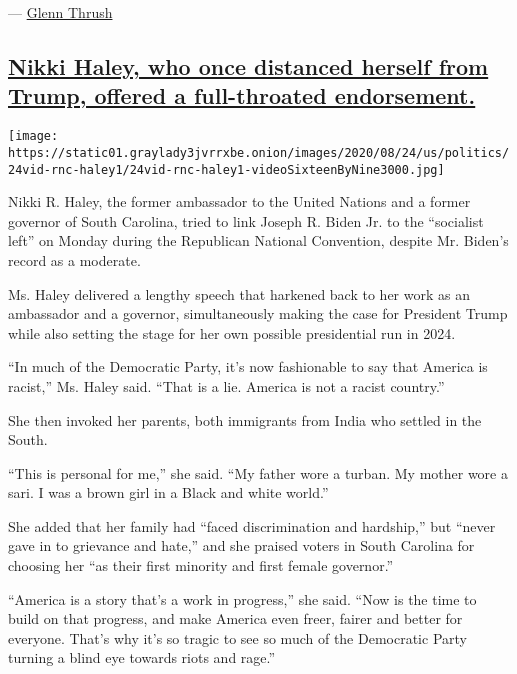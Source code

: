 --- \href{https://www.nytimes3xbfgragh.onion/by/glenn-thrush}{Glenn
Thrush}

\hypertarget{nikki-haley-who-once-distanced-herself-from-trump-offered-a-full-throated-endorsement}{%
\subsection{\texorpdfstring{\protect\hyperlink{Nikki-Haley-who-once-distanced-herself-from-Trump-offered-a-full-throated-endorsement}{Nikki
Haley, who once distanced herself from Trump, offered a full-throated
endorsement.}}{Nikki Haley, who once distanced herself from Trump, offered a full-throated endorsement.}}\label{nikki-haley-who-once-distanced-herself-from-trump-offered-a-full-throated-endorsement}}

\texttt{[image: https://static01.graylady3jvrrxbe.onion/images/2020/08/24/us/politics/24vid-rnc-haley1/24vid-rnc-haley1-videoSixteenByNine3000.jpg]}

Nikki R. Haley, the former ambassador to the United Nations and a former
governor of South Carolina, tried to link Joseph R. Biden Jr. to the
``socialist left'' on Monday during the Republican National Convention,
despite Mr. Biden's record as a moderate.

Ms. Haley delivered a lengthy speech that harkened back to her work as
an ambassador and a governor, simultaneously making the case for
President Trump while also setting the stage for her own possible
presidential run in 2024.

``In much of the Democratic Party, it's now fashionable to say that
America is racist,'' Ms. Haley said. ``That is a lie. America is not a
racist country.''

She then invoked her parents, both immigrants from India who settled in
the South.

``This is personal for me,'' she said. ``My father wore a turban. My
mother wore a sari. I was a brown girl in a Black and white world.''

She added that her family had ``faced discrimination and hardship,'' but
``never gave in to grievance and hate,'' and she praised voters in South
Carolina for choosing her ``as their first minority and first female
governor.''

``America is a story that's a work in progress,'' she said. ``Now is the
time to build on that progress, and make America even freer, fairer and
better for everyone. That's why it's so tragic to see so much of the
Democratic Party turning a blind eye towards riots and rage.''

